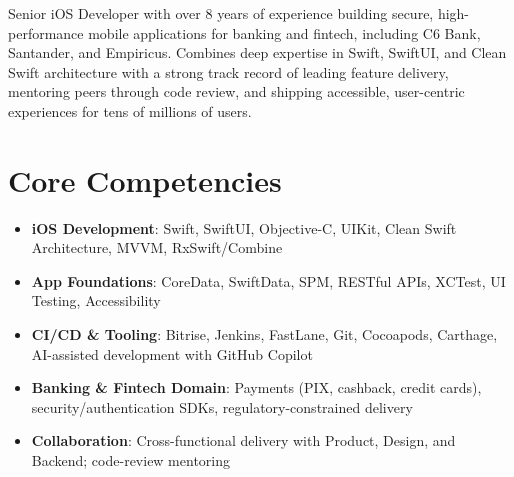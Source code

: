 \documentclass[11pt,a4paper,sans]{moderncv}
\begin{document}
\makecvtitle


\vspace{6pt}
\small{Senior iOS Developer with over 8 years of experience building secure, high-performance mobile applications for banking and fintech, including C6 Bank, Santander, and Empiricus. Combines deep expertise in Swift, SwiftUI, and Clean Swift architecture with a strong track record of leading feature delivery, mentoring peers through code review, and shipping accessible, user-centric experiences for tens of millions of users.}


\section{Core Competencies}
\vspace{1pt}
\begin{itemize}

\item \textbf{iOS Development}: Swift, SwiftUI, Objective-C, UIKit, Clean Swift Architecture, MVVM, RxSwift/Combine

\item \textbf{App Foundations}: CoreData, SwiftData, SPM, RESTful APIs, XCTest, UI Testing, Accessibility

\item \textbf{CI/CD \& Tooling}: Bitrise, Jenkins, FastLane, Git, Cocoapods, Carthage, AI-assisted development with GitHub Copilot

\item \textbf{Banking \& Fintech Domain}: Payments (PIX, cashback, credit cards), security/authentication SDKs, regulatory-constrained delivery

\item \textbf{Collaboration}: Cross-functional delivery with Product, Design, and Backend; code-review mentoring

\end{itemize}

\end{document}
